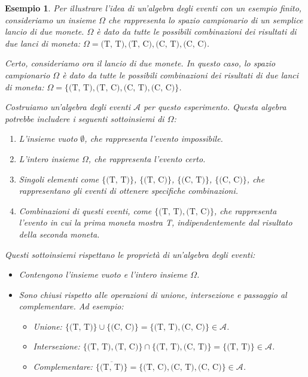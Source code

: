 \documentclass[
  11pt,
]{book}
\providecommand{\tightlist}{%
  \setlength{\itemsep}{0pt}\setlength{\parskip}{0pt}}
\theoremstyle{mytheoremstyle}
\theoremstyle{mydefstyle}
\newtheorem{example}{{Esempio}}[section]
\begin{document}
\begin{example}
Per illustrare l'idea di un'algebra degli eventi con un esempio finito, consideriamo un insieme \(\Omega\) che rappresenta lo spazio campionario di un semplice lancio di due monete. \(\Omega\) è dato da tutte le possibili combinazioni dei risultati di due lanci di moneta: \(\Omega = {\text{(T, T)}, \text{(T, C)}, \text{(C, T)}, \text{(C, C)}}\).

Certo, consideriamo ora il lancio di due monete. In questo caso, lo spazio campionario \(\Omega\) è dato da tutte le possibili combinazioni dei risultati di due lanci di moneta: \(\Omega = \{\text{(T, T)}, \text{(T, C)}, \text{(C, T)}, \text{(C, C)}\}\).

Costruiamo un'algebra degli eventi \(\mathscr{A}\) per questo esperimento. Questa algebra potrebbe includere i seguenti sottoinsiemi di \(\Omega\):

\begin{enumerate}
\def\labelenumi{\arabic{enumi}.}
\tightlist
\item
  L'insieme vuoto \(\emptyset\), che rappresenta l'evento impossibile.
\item
  L'intero insieme \(\Omega\), che rappresenta l'evento certo.
\item
  Singoli elementi come \(\{\text{(T, T)}\}\), \(\{\text{(T, C)}\}\), \(\{\text{(C, T)}\}\), \(\{\text{(C, C)}\}\), che rappresentano gli eventi di ottenere specifiche combinazioni.
\item
  Combinazioni di questi eventi, come \(\{\text{(T, T)}, \text{(T, C)}\}\), che rappresenta l'evento in cui la prima moneta mostra T, indipendentemente dal risultato della seconda moneta.
\end{enumerate}

Questi sottoinsiemi rispettano le proprietà di un'algebra degli eventi:

\begin{itemize}
\tightlist
\item
  Contengono l'insieme vuoto e l'intero insieme \(\Omega\).
\item
  Sono chiusi rispetto alle operazioni di unione, intersezione e passaggio al complementare. Ad esempio:

  \begin{itemize}
  \tightlist
  \item
    Unione: \(\{\text{(T, T)}\} \cup \{\text{(C, C)}\} = \{\text{(T, T)}, \text{(C, C)}\} \in \mathscr{A}\).
  \item
    Intersezione: \(\{\text{(T, T)}, \text{(T, C)}\} \cap \{\text{(T, T)}, \text{(C, T)}\} = \{\text{(T, T)}\} \in \mathscr{A}\).
  \item
    Complementare: \(\overline{\{\text{(T, T)}\}} = \{\text{(T, C)}, \text{(C, T)}, \text{(C, C)}\} \in \mathscr{A}\).
  \end{itemize}
\end{itemize}


\end{example}
\end{document}
